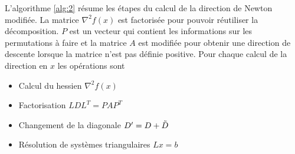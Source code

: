 \noindent
L'algorithme \ref{alg:2} r\'esume les \'etapes du calcul de la direction de Newton modifi\'ee.
La matrice $\nabla^2 f(x)$ est factoris\'ee pour pouvoir r\'eutiliser la d\'ecomposition.
$P$ est un vecteur qui contient les informations sur les permutations \`a faire et la matrice $A$ est
modifi\'ee pour obtenir une direction de descente lorsque la matrice n'est pas d\'efinie positive.
Pour chaque calcul de la direction en $x$ les op\'erations sont
\begin{itemize}
\item Calcul du hessien $\nabla^2 f(x)$
\item Factorisation $LDL^T=PAP^T$
\item Changement de la diagonale $D'=D+\Tilde{D}$
\item R\'esolution de syst\`emes triangulaires $Lx=b$
\end{itemize}

